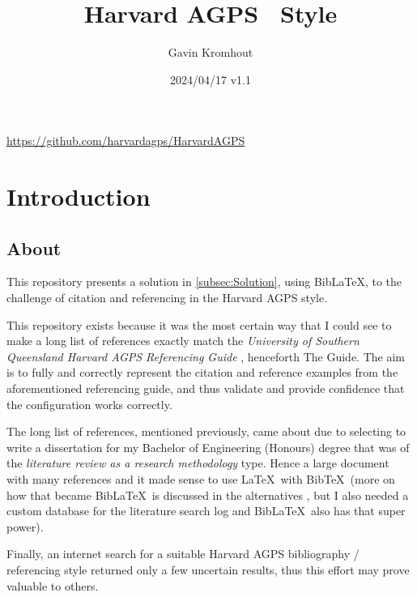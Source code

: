 \documentclass[a4paper, 11pt]{article}
\title{Harvard AGPS \BibLaTeX\ Style}
\author{Gavin Kromhout}
\date{2024/04/17 v1.1}
\newcommand*{\repobaseurl}{https://github.com/harvardagps/HarvardAGPS}
\newcommand*{\BibTeX}{{\sc Bib}\TeX}
\newcommand*{\BibLaTeX}{Bib\LaTeX}
\begin{document}

\maketitle

\begin{center}
    {\color{Magenta} \url{\repobaseurl}}
\end{center}

\tableofcontents

\section{Introduction}

\subsection{About}

This repository presents a solution in \cref{subsec:Solution}, using \BibLaTeX, to the challenge of
citation and referencing in the Harvard AGPS style.

This repository exists because it was the most certain way that I could see to make a long list of
references exactly match the \emph{University of Southern Queensland Harvard AGPS Referencing Guide}
\autocite{UniSQ2020HarvarAGPSRefere}, henceforth The Guide. The aim is to fully and correctly
represent the citation and reference examples from the aforementioned referencing guide, and thus
validate and provide confidence that the configuration works correctly.

The long list of references, mentioned previously, came about due to selecting to write a
dissertation for my Bachelor of Engineering (Honours) degree that was of the \emph{literature review
    as a research methodology} type. Hence a large document with many references and it made sense to
use \LaTeX\ with \BibTeX\ (more on how that became \BibLaTeX\ is discussed in the alternatives
, but I also needed a custom database for the literature search log
and \BibLaTeX\ also has that super power).

Finally, an internet search for a suitable Harvard AGPS bibliography / referencing style returned
only a few uncertain results, thus this effort may prove valuable to others.
\end{document}
